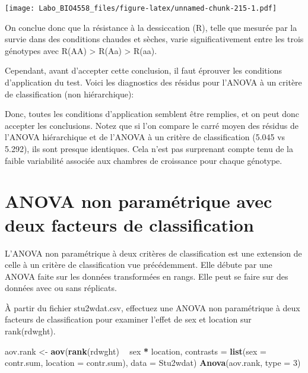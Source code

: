 \documentclass[12pt,]{book}
\newenvironment{Shaded}{\begin{snugshade}}{\end{snugshade}}
\newcommand{\DataTypeTok}[1]{\textcolor[rgb]{0.27,0.27,0.27}{#1}}
\newcommand{\DecValTok}[1]{\textcolor[rgb]{0.06,0.06,0.06}{#1}}
\newcommand{\KeywordTok}[1]{\textcolor[rgb]{0.27,0.27,0.27}{\textbf{#1}}}
\newcommand{\NormalTok}[1]{#1}
\newcommand{\OperatorTok}[1]{\textcolor[rgb]{0.43,0.43,0.43}{\textbf{#1}}}
\newcommand{\StringTok}[1]{\textcolor[rgb]{0.5,0.5,0.5}{#1}}
\begin{document}
\texttt{[image: Labo\_BIO4558\_files/figure-latex/unnamed-chunk-215-1.pdf]}

On conclue donc que la résistance à la dessiccation (R), telle que mesurée par la survie dans des conditions chaudes et sèches, varie significativement entre les trois génotypes avec R(AA) \textgreater{} R(Aa) \textgreater{} R(aa).

Cependant, avant d'accepter cette conclusion, il faut éprouver les conditions d'application du test. Voici les diagnostics des résidus pour l'ANOVA à un critère de classification (non hiérarchique):

Donc, toutes les conditions d'application semblent être remplies, et on peut donc accepter les conclusions. Notez que si l'on compare le carré moyen des résidus de l'ANOVA hiérarchique et de l'ANOVA à un critère de classification (5.045 vs 5.292), ils sont presque identiques. Cela n'est pas surprenant compte tenu de la faible variabilité associée aux chambres de croissance pour chaque génotype.

\hypertarget{anova-non-paramuxe9trique-avec-deux-facteurs-de-classification}{%
\section{ANOVA non paramétrique avec deux facteurs de classification}\label{anova-non-paramuxe9trique-avec-deux-facteurs-de-classification}}

L'ANOVA non paramétrique à deux critères de classification est une extension de celle à un critère de classification vue précédemment. Elle débute par une ANOVA faite sur les données transformées en rangs. Elle peut se faire sur des données avec ou sans réplicats.

À partir du fichier stu2wdat.csv, effectuez une ANOVA non paramétrique à deux facteurs de classification pour examiner l'effet de sex et location sur rank(rdwght).

\begin{Shaded}
\begin{Highlighting}[]
\NormalTok{aov.rank <-}\StringTok{ }\KeywordTok{aov}\NormalTok{(}\KeywordTok{rank}\NormalTok{(rdwght) }\OperatorTok{~}\StringTok{ }\NormalTok{sex }\OperatorTok{*}\StringTok{ }\NormalTok{location,}
\DataTypeTok{contrasts =} \KeywordTok{list}\NormalTok{(}\DataTypeTok{sex =}\NormalTok{ contr.sum,}
\DataTypeTok{location =}\NormalTok{ contr.sum), }\DataTypeTok{data =}\NormalTok{ Stu2wdat)}
\KeywordTok{Anova}\NormalTok{(aov.rank, }\DataTypeTok{type =} \DecValTok{3}\NormalTok{)}
\end{Highlighting}
\end{Shaded}
\end{document}
